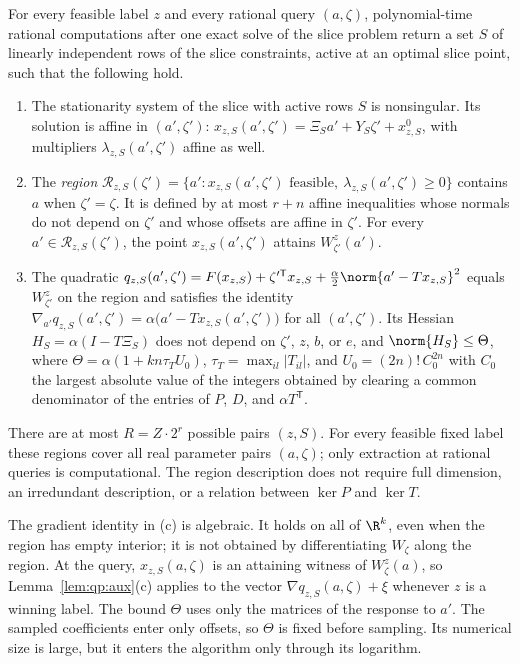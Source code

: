 \begin{lemma}\label{lem:qp:pieces}
For every feasible label $z$ and every rational query $(a,\zeta)$, polynomial-time
rational computations after one exact solve of the slice problem return a
set $S$ of linearly independent rows of the slice constraints, active at an
optimal slice point, such that the following hold.
\begin{enumerate}[label=(\alph*)]
\item The stationarity system of the slice with active rows $S$ is
 nonsingular. Its solution is affine in $(a',\zeta')$:
 $x_{z,S}(a',\zeta')=\Xi_Sa'+Y_S\zeta'+x^0_{z,S}$, with multipliers
 $\lambda_{z,S}(a',\zeta')$ affine as well.
\item The \emph{region}
 $\mathcal R_{z,S}(\zeta')=\{a':x_{z,S}(a',\zeta')\text{ feasible},\
 \lambda_{z,S}(a',\zeta')\ge0\}$ contains $a$ when $\zeta'=\zeta$.
 It is defined by at most $r+n$
 affine inequalities whose normals do not depend on $\zeta'$ and whose
 offsets are affine in $\zeta'$. For every $a'\in\mathcal R_{z,S}(\zeta')$,
 the point $x_{z,S}(a',\zeta')$ attains $W^z_{\zeta'}(a')$.
\item The quadratic
 $q_{z,S}(a',\zeta')=F(x_{z,S})+\zeta'^{\mathsf T} x_{z,S}+\frac\alpha2\norm{a'-Tx_{z,S}}^2$
 equals $W^z_{\zeta'}$ on the region and satisfies the identity
 $\nabla_{a'}q_{z,S}(a',\zeta')=\alpha\bigl(a'-Tx_{z,S}(a',\zeta')\bigr)$ for
 all $(a',\zeta')$. Its Hessian $H_S=\alpha(I-T\Xi_S)$ does not depend on
 $\zeta'$, $z$, $b$, or $e$, and $\norm{H_S}\le\Theta$, where
 $\Theta=\alpha(1+kn\tau_TU_0)$, $\tau_T=\max_{il}|T_{il}|$, and
 $U_0=(2n)!\,C_0^{2n}$ with $C_0$ the largest absolute value of the integers
 obtained by clearing a common denominator of the entries of $P$, $D$, and
 $\alpha T^{\mathsf T}$.
\end{enumerate}
There are at most $R=Z\cdot2^r$ possible pairs $(z,S)$.
For every feasible fixed label these regions cover all real parameter
pairs $(a,\zeta)$; only extraction at rational queries is computational.
The region description does not require full dimension, an irredundant
description, or a relation between $\ker P$ and $\ker T$.
\end{lemma}

The gradient identity in (c) is algebraic. It holds on all of $\R^k$, even
when the region has empty interior; it is not obtained by differentiating
$W_\zeta$ along the region. At the query, $x_{z,S}(a,\zeta)$ is an attaining
witness of $W^z_\zeta(a)$, so Lemma~\ref{lem:qp:aux}(c) applies to the
vector $\nabla q_{z,S}(a,\zeta)+\xi$ whenever $z$ is a winning label. The bound
$\Theta$ uses only the matrices of the response to $a'$. The sampled
coefficients enter only offsets, so $\Theta$ is fixed before sampling. Its
numerical size is large, but it enters the algorithm only through its
logarithm.

